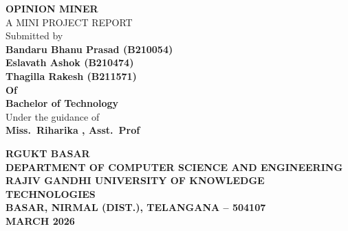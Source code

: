 \documentclass[12pt,a4paper]{report}
\begin{document}
\begin{titlepage}
\centering
\vspace*{1cm}
{\Large\textbf{OPINION MINER}\\[6pt]
A MINI PROJECT REPORT}\\[1cm]
{\normalsize Submitted by}\\[6pt]
{\large\textbf{Bandaru Bhanu Prasad (B210054)\\
Eslavath Ashok (B210474)\\
Thagilla Rakesh (B211571)}}\\[1cm]
{\normalsize\textbf{Of}}\\[6pt]
{\large\textbf{Bachelor of Technology}}\\[6pt]
{\normalsize Under the guidance of}\\[4pt]
{\large\textbf{Miss.\ Riharika , Asst.\ Prof}}\\[1.5cm]

\begin{figure}[H]
\centering
{}
\end{figure}

\vspace{0.5cm}
{\small\textbf{RGUKT BASAR}}\\[6pt]
{\large\textbf{DEPARTMENT OF COMPUTER SCIENCE AND ENGINEERING\\
RAJIV GANDHI UNIVERSITY OF KNOWLEDGE TECHNOLOGIES\\
BASAR, NIRMAL (DIST.), TELANGANA -- 504107\\
MARCH 2026}}

\thispagestyle{fancy}
\setcounter{page}{1}
\end{titlepage}

\newpage
{}
\setcounter{page}{2}
\thispagestyle{fancy}
\end{document}
